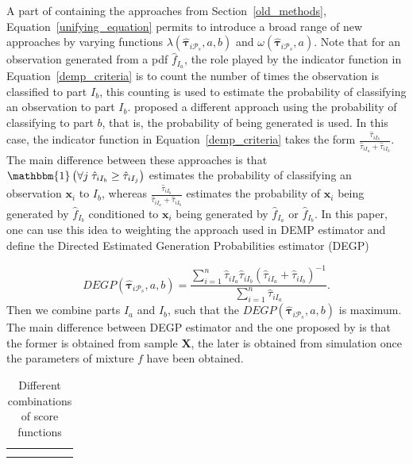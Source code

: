 \documentclass[10pt, a4paper]{article}
\newcommand{\m}[1]{\boldsymbol{#1}}
\begin{document}
\begin{spacing}{1.9}
A part of containing the approaches from Section~\ref{old_methods}, Equation~\ref{unifying_equation} permits to introduce a broad range of new approaches by varying functions $\lambda(\hat{\m \tau}_{i \mathcal{P}_s}, a, b)$ and $\omega(\hat{\m \tau}_{i \mathcal{P}_s}, a)$. Note that for an observation generated from a pdf $\hat{f}_{I_a}$, the role played by the indicator function in Equation~\ref{demp_criteria} is to count the number of times the observation is classified to part $I_b$, this counting is used to estimate the probability of classifying an observation to part $I_b$. \cite{longford2014} proposed a different approach using the probability of classifying to part $b$, that is, the probability of being generated is used. In this case, the indicator function in Equation~\ref{demp_criteria} takes the form $\frac{\hat{\tau}_{iI_b}}{\hat{\tau}_{iI_a} + \hat{\tau}_{iI_b}}$. The main difference between these approaches is that $\mathbbm{1}\left( \forall j\; \hat{\tau}_{i I_{b}} \geq \hat{\tau}_{iI_j} \right)$ estimates the probability of classifying an observation $\m x_i$ to $I_b$, whereas $\frac{\hat{\tau}_{iI_b}}{\hat{\tau}_{iI_a} + \hat{\tau}_{iI_b}}$ estimates the probability of $\m x_i$ being generated by $\hat{f}_{I_b}$ conditioned to $\m x_i$  being generated by $\hat{f}_{I_a}$ or $\hat{f}_{I_b}$. In this paper, one can use this idea to weighting the approach used in DEMP estimator and define the Directed Estimated Generation Probabilities estimator (DEGP)

\begin{equation}\label{demp2_criteria}
DEGP(\hat{\m \tau}_{i \mathcal{P}_s}, a, b) =\frac{ \sum_{i=1}^n \hat{\tau}_{iI_a} \hat{\tau}_{iI_b}(\hat{\tau}_{iI_a} + \hat{\tau}_{iI_b})^{-1}  }{\sum_{i=1}^n \hat{\tau}_{iI_a} }.
\end{equation}
Then we combine parts $I_a$ and $I_b$, such that the $DEGP(\hat{\m \tau}_{i \mathcal{P}_s}, a, b)$ is maximum. The main difference between DEGP estimator and the one proposed by \cite{longford2014} is that the former is obtained from sample $\m X$, the later is obtained from simulation once the parameters of mixture $f$ have been obtained.

\begin{table}[htpb]
\caption{Different combinations of score functions}
\begin{tabular}{c  c | >{\centering}m{0.7in} | >{\centering}m{0.8in} | >{\centering}m{0.7in} | m{0in}}
 & \multicolumn{1}{c}{} & \multicolumn{1}{c}{} & \multicolumn{1}{c}{} & \multicolumn{1}{c}{} & \multicolumn{1}{c}{}\\
 & \multicolumn{1}{c}{} & \multicolumn{3}{c}{$\omega(\boldsymbol\tau_i, a)$} &\\


\end{tabular}
\end{table}
\end{spacing}
\end{document}
